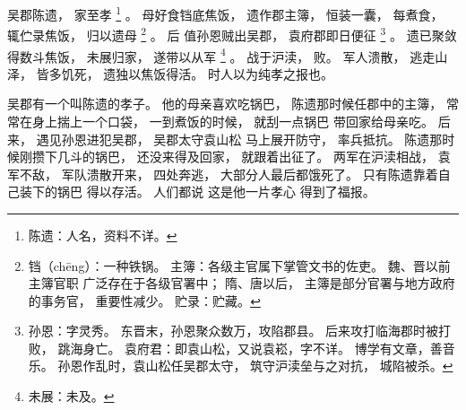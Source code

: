 
\switchcolumn*[\section{}]

吴郡陈遗，
家至孝%
\footnote{%
    陈遗：人名，资料不详。
}%
。
母好食铛底焦饭，
遗作郡主簿，
恒装一囊，
每煮食，
辄伫录焦饭，
归以遗母%
\footnote{%
    铛（chēng）：一种铁锅。
    主簿：各级主官属下掌管文书的佐吏。
          魏、晋以前主簿官职
          广泛存在于各级官署中；
          隋、唐以后，
          主簿是部分官署与地方政府的事务官，
          重要性减少。
    贮录：贮藏。
}%
。
后
值孙恩贼出吴郡，
袁府郡即日便征%
\footnote{%
    孙恩：字灵秀。
          东晋末，孙恩聚众数万，攻陷郡县。
          后来攻打临海郡时被打败，
          跳海身亡。
    袁府君：即袁山松，又说袁崧，字不详。
            博学有文章，善音乐。
            孙恩作乱时，袁山松任吴郡太守，
            筑守沪渎垒与之对抗，
            城陷被杀。
}%
。
遗已聚敛得数斗焦饭，
未展归家，
遂带以从军%
\footnote{%
    未展：未及。
}%
。
战于沪渎，
败。
军人溃散，
逃走山泽，
皆多饥死，
遗独以焦饭得活。
时人以为纯孝之报也。

\switchcolumn

吴郡有一个叫陈遗的孝子。
他的母亲喜欢吃锅巴，
陈遗那时候任郡中的主簿，
常常在身上揣上一个口袋，
一到煮饭的时候，
就刮一点锅巴
带回家给母亲吃。
后来，
遇见孙恩进犯吴郡，
吴郡太守袁山松
马上展开防守，
率兵抵抗。
陈遗那时候刚攒下几斗的锅巴，
还没来得及回家，
就跟着出征了。
两军在沪渎相战，
袁军不敌，
军队溃散开来，
四处奔逃，
大部分人最后都饿死了。
只有陈遗靠着自己装下的锅巴
得以存活。
人们都说
这是他一片孝心
得到了福报。

